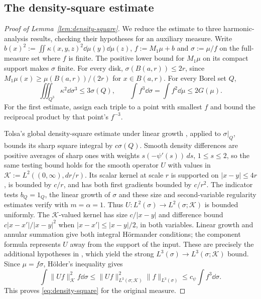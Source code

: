 \subsection{The density-square estimate}\label{subsec:density-square-proof}
\begin{proof}[Proof of Lemma~\ref{lem:density-square}]
We reduce the estimate to three harmonic-analysis results, checking their hypotheses for an auxiliary measure.
Write $b(x)^2:=\iint\kappa(x,y,z)^2\dd\mu(y)\dd\mu(z)$, $f:=M_1\mu+b$ and $\sigma:=\mu/f$ on the full-measure set where $f$ is finite.
The positive lower bound for $M_1\mu$ on its compact support makes $\sigma$ finite.
For every disk, $\sigma(B(a,r))\le2r$, since $M_1\mu(x)\ge\mu(B(a,r))/(2r)$ for $x\in B(a,r)$.
For every Borel set $Q$,
\[
 \iiint_{Q^3}\kappa^2\dd\sigma^3\le3\sigma(Q),\qquad
 \int f^3\dd\sigma=\int f^2\dd\mu\le2G(\mu).
\]
For the first estimate, assign each triple to a point with smallest $f$ and bound the reciprocal product by that point's $f^{-3}$.

Tolsa's global density-square estimate under linear growth \cite[Theorem~19.1, arXiv version]{Tol17}, applied to $\sigma|_Q$, bounds its sharp square integral by $c\sigma(Q)$.
Smooth density differences are positive averages of sharp ones with weights $s(-\psi'(s))\,ds$, $1\le s\le2$, so the same testing bound holds for the smooth operator $U$ with values in $\mathcal K:=L^2((0,\infty),dr/r)$.
Its scalar kernel at scale $r$ is supported on $|x-y|\le4r$, is bounded by $c/r$, and has both first gradients bounded by $c/r^2$.
The indicator tests $b_Q=1_Q$, the linear growth of $\sigma$ and these size and second-variable regularity estimates verify \cite[Theorem~1.3]{LM17} with $m=\alpha=1$.
Thus $U:L^2(\sigma)\to L^2(\sigma;\mathcal K)$ is bounded uniformly.
The $\mathcal K$-valued kernel has size $c/|x-y|$ and difference bound $c|x-x'|/|x-y|^2$ when $|x-x'|\le|x-y|/2$, in both variables.
Linear growth and annular summation give both integral H\"ormander conditions; the component formula represents $U$ away from the support of the input.
These are precisely the additional hypotheses in \cite[Definition~2.1 and Theorem~2.7]{GM00}, which yield the strong $L^3(\sigma)\to L^3(\sigma;\mathcal K)$ bound.
Since $\mu=f\sigma$, H\"older's inequality gives
\[
 \int\|Uf\|_{\mathcal K}^2f\dd\sigma
 \le\|Uf\|_{L^3(\sigma;\mathcal K)}^2\|f\|_{L^3(\sigma)}
 \le c_\psi\int f^3\dd\sigma.
\]
This proves \eqref{eq:density-square} for the original measure.
\end{proof}
